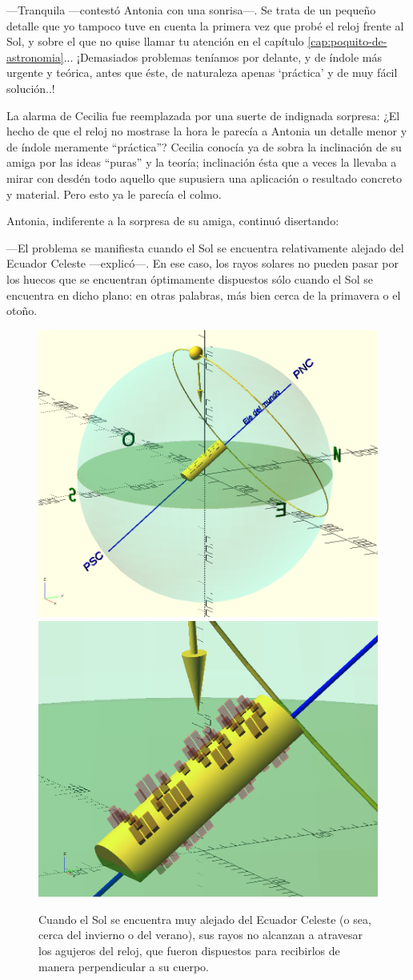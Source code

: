 ---Tranquila ---contestó Antonia con una sonrisa---. Se trata de un
pequeño detalle que yo tampoco tuve en cuenta la primera vez que probé
el reloj frente al Sol, y sobre el que no quise llamar tu atención en
el capítulo \ref{cap:poquito-de-astronomia}... ¡Demasiados problemas
teníamos por delante, y de índole más urgente y teórica, antes que
éste, de naturaleza apenas `práctica' y de muy fácil solución..!

La alarma de Cecilia fue reemplazada por una suerte de indignada
sorpresa: ¿El hecho de que el reloj no mostrase la hora le parecía a
Antonia un detalle menor y de índole meramente ``práctica''? Cecilia
conocía ya de sobra la inclinación de su amiga por las ideas ``puras''
y la teoría; inclinación ésta que a veces la llevaba a mirar con
desdén todo aquello que supusiera una aplicación o resultado concreto
y material. Pero esto ya le parecía el colmo.

Antonia, indiferente a la sorpresa de su amiga, continuó disertando:

---El problema se manifiesta cuando el Sol se encuentra relativamente
alejado del Ecuador Celeste ---explicó---. En ese caso, los rayos
solares no pueden pasar por los huecos que se encuentran óptimamente
dispuestos sólo cuando el Sol se encuentra en dicho plano: en otras
palabras, más bien cerca de la primavera o el otoño.

\begin{figure}[ht]
  \centering
  \includegraphics[width=.49\textwidth]{imagenes/orientacion-reloj-solsticio.png}\hfill
  \includegraphics[width=.49\textwidth]{imagenes/orientacion-reloj-solsticio-zoom.png}
  \caption{Cuando el Sol se encuentra muy alejado del Ecuador Celeste
    (o sea, cerca del invierno o del verano), sus rayos no alcanzan a
    atravesar los agujeros del reloj, que fueron dispuestos para
    recibirlos de manera perpendicular a su cuerpo.}
  \label{fig:orientacion-reloj-2}
\end{figure}

